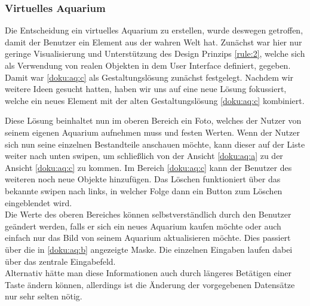 \subsubsection{Virtuelles Aquarium}
Die Entscheidung ein virtuelles Aquarium zu erstellen, wurde deswegen getroffen, damit der Benutzer ein Element aus der wahren Welt hat. Zunächst war hier nur geringe Visualisierung und Unterstützung des Design Prinzips \ref{rule:2}, welche sich als Verwendung von realen Objekten in dem User Interface definiert, gegeben. Damit war \ref{doku:aq:c} 
als Gestaltungslösung zunächst festgelegt. Nachdem wir weitere Ideen gesucht hatten, haben wir uns auf eine neue Lösung fokussiert, welche ein neues Element mit der alten Gestaltungslösung \ref{doku:aq:c} kombiniert. 

Diese Lösung beinhaltet nun im oberen Bereich ein Foto, welches der Nutzer von seinem eigenen Aquarium aufnehmen muss und festen Werten. Wenn der Nutzer sich nun seine einzelnen Bestandteile anschauen möchte, kann dieser auf der Liste weiter nach unten swipen, um schließlich von der Ansicht \ref{doku:aq:a} zu der Ansicht \ref{doku:aq:c} zu kommen. Im Bereich \ref{doku:aq:c} kann der Benutzer des weiteren noch neue Objekte hinzufügen. Das Löschen funktioniert über das bekannte swipen nach links, in welcher Folge dann ein Button zum Löschen eingeblendet wird.\\
Die Werte des oberen Bereiches können selbstverständlich durch den Benutzer geändert werden, falls er sich ein neues Aquarium kaufen möchte oder auch einfach nur das Bild von seinem Aquarium aktualisieren möchte. Dies passiert über die in \ref{doku:aq:b} angezeigte Maske. Die einzelnen Eingaben laufen dabei über das zentrale Eingabefeld. \\
Alternativ hätte man diese Informationen auch durch längeres Betätigen einer Taste ändern können, allerdings ist die Änderung der vorgegebenen Datensätze nur sehr selten nötig.

